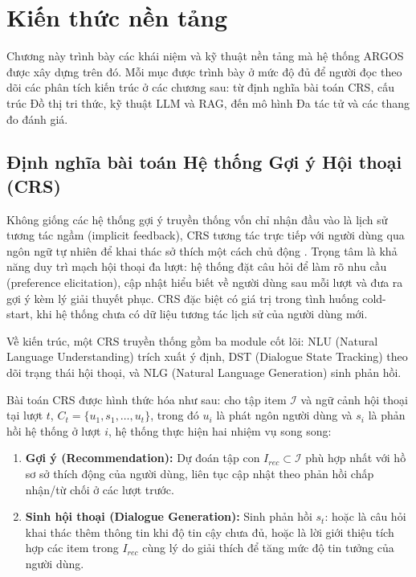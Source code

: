 \chapter{Kiến thức nền tảng}\label{chap:background}

Chương này trình bày các khái niệm và kỹ thuật nền tảng mà hệ thống ARGOS được xây dựng trên đó. Mỗi mục được trình bày ở mức độ đủ để người đọc theo dõi các phân tích kiến trúc ở các chương sau: từ định nghĩa bài toán CRS, cấu trúc Đồ thị tri thức, kỹ thuật LLM và RAG, đến mô hình Đa tác tử và các thang đo đánh giá.

\section{Định nghĩa bài toán Hệ thống Gợi ý Hội thoại (CRS)}
Không giống các hệ thống gợi ý truyền thống vốn chỉ nhận đầu vào là lịch sử tương tác ngầm (implicit feedback), CRS tương tác trực tiếp với người dùng qua ngôn ngữ tự nhiên để khai thác sở thích một cách chủ động \cite{li2018towards, christakopoulou2016towardscrs}. Trọng tâm là khả năng duy trì mạch hội thoại đa lượt: hệ thống đặt câu hỏi để làm rõ nhu cầu (preference elicitation), cập nhật hiểu biết về người dùng sau mỗi lượt và đưa ra gợi ý kèm lý giải thuyết phục. CRS đặc biệt có giá trị trong tình huống cold-start, khi hệ thống chưa có dữ liệu tương tác lịch sử của người dùng mới.

Về kiến trúc, một CRS truyền thống gồm ba module cốt lõi: NLU (Natural Language Understanding) trích xuất ý định, DST (Dialogue State Tracking) theo dõi trạng thái hội thoại, và NLG (Natural Language Generation) sinh phản hồi.

Bài toán CRS được hình thức hóa như sau: cho tập item $\mathcal{I}$ và ngữ cảnh hội thoại tại lượt $t$, $C_t = \{u_1, s_1, \dots, u_t\}$, trong đó \mbox{$u_i$} là phát ngôn người dùng và \mbox{$s_i$} là phản hồi hệ thống ở lượt \mbox{$i$}, hệ thống thực hiện hai nhiệm vụ song song:
\begin{enumerate}
    \item \textbf{Gợi ý (Recommendation):} Dự đoán tập con $I_{rec} \subset \mathcal{I}$ phù hợp nhất với hồ sơ sở thích động của người dùng, liên tục cập nhật theo phản hồi chấp nhận/từ chối ở các lượt trước.
    \item \textbf{Sinh hội thoại (Dialogue Generation):} Sinh phản hồi $s_t$: hoặc là câu hỏi khai thác thêm thông tin khi độ tin cậy chưa đủ, hoặc là lời giới thiệu tích hợp các item trong $I_{rec}$ cùng lý do giải thích để tăng mức độ tin tưởng của người dùng.
\end{enumerate}

